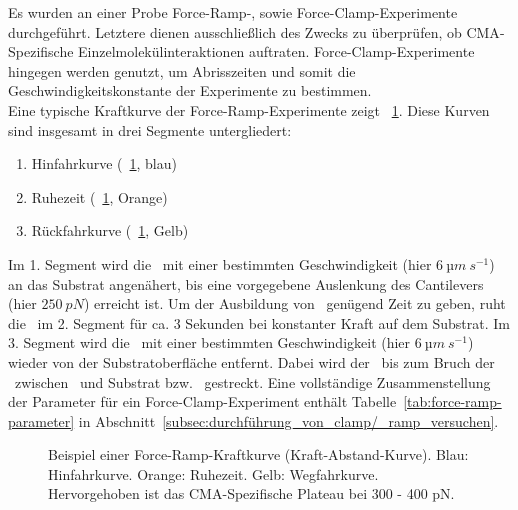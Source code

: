 Es wurden an einer Probe Force-Ramp-, sowie Force-Clamp-Experimente durchgeführt. Letztere dienen ausschließlich des Zwecks zu überprüfen, ob \ac{CMA}-Spezifische Einzelmolekülinteraktionen auftraten. Force-Clamp-Experimente hingegen werden genutzt, um Abrisszeiten und somit die Geschwindigkeitskonstante der Experimente zu bestimmen.\\

Eine typische Kraftkurve der Force-Ramp-Experimente zeigt \abb~\ref{fig:force_ramp_kurve}. Diese Kurven sind insgesamt in drei Segmente untergliedert:

\begin{enumerate}
	\renewcommand\labelenumi{\bfseries\theenumi.}
	
	\item Hinfahrkurve (\abb~\ref{fig:force_ramp_kurve}, blau)
	\item Ruhezeit (\abb~\ref{fig:force_ramp_kurve}, Orange)
	\item Rückfahrkurve (\abb~\ref{fig:force_ramp_kurve}, Gelb)
	
\end{enumerate}

Im 1. Segment wird die \spitze~mit einer bestimmten Geschwindigkeit (hier $6~µm~s^{-1}$) an das Substrat angenähert, bis eine vorgegebene Auslenkung des Cantilevers (hier $250~pN$) erreicht ist. Um der Ausbildung von \amid~genügend Zeit zu geben, ruht die \spitze~im 2. Segment für ca. 3 Sekunden bei konstanter Kraft auf dem Substrat. Im 3. Segment wird die \spitze~mit einer bestimmten Geschwindigkeit (hier $6~µm~s^{-1}$) wieder von der Substratoberfläche entfernt. Dabei wird der \spacer~bis zum Bruch der \amid~zwischen \spacer~und Substrat bzw. \spitze~gestreckt. Eine vollständige Zusammenstellung der Parameter für ein Force-Clamp-Experiment enthält Tabelle~\ref{tab:force-ramp-parameter} in Abschnitt~\ref{subsec:durchführung_von_clamp/_ramp_versuchen}.\\

\begin{figure}[h]
	\centering
	\caption[Beispiel einer Force-Ramp-Kraftkurve]{Beispiel einer Force-Ramp-Kraftkurve (Kraft-Abstand-Kurve). Blau: Hinfahrkurve. Orange: Ruhezeit. Gelb: Wegfahrkurve. Hervorgehoben ist das \acs*{CMA}-Spezifische Plateau bei 300 - 400 pN.}
	\label{fig:force_ramp_kurve}
\end{figure}

